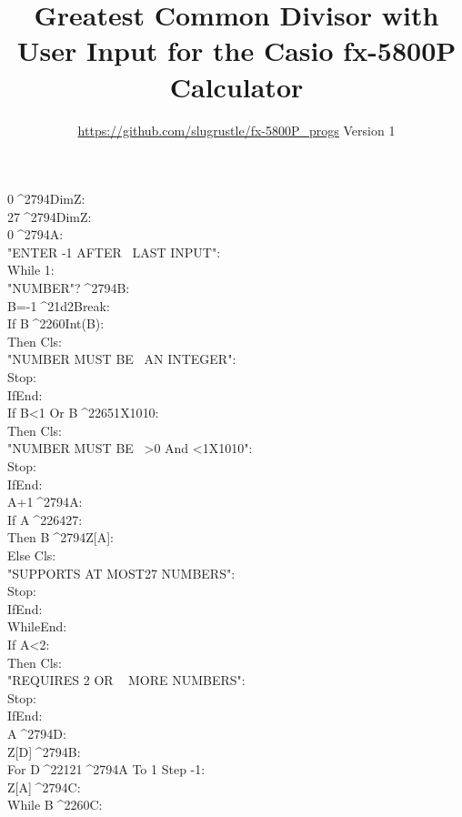 \documentclass[11pt,letterpaper,twocolumn]{article}
\date{}
\newcommand{\STO}{{\large ^^^^2794}}
\newcommand{\CBR}{{\Large ^^^^21d2}}
\newcommand{\NEQ}{^^^^2260}
\newcommand{\LEQ}{^^^^2264}
\newcommand{\GEQ}{^^^^2265}
\newcommand{\MINUS}{^^^^2212}
\newcommand{\EXPTEN}{{\scriptsize X10}}
\newcommand{\IDENT}[1]{\hspace*{#1\BaseIndent}}
\begin{document}
\title{Greatest Common Divisor with User Input for the Casio fx-5800P Calculator}
\author{\url{https://github.com/slugrustle/fx-5800P_progs} \quad Version 1}
\maketitle
\thispagestyle{fancy}

\begin{linenumbers}
0\STO DimZ:\\
27\STO DimZ:\\
0\STO A:\\
"ENTER -1 AFTER ~LAST INPUT":\\
While 1:\\
\IDENT{1}"NUMBER"?\STO B:\\
\IDENT{1}B=-1\CBR Break:\\
\IDENT{1}If B\NEQ Int(B):\\
\IDENT{2}Then Cls:\\
\IDENT{2}"NUMBER MUST BE ~AN INTEGER":\\
\IDENT{2}Stop:\\
\IDENT{1}IfEnd:\\
\IDENT{1}If B<1 Or B\GEQ 1\EXPTEN 10:\\
\IDENT{2}Then Cls:\\
\IDENT{2}"NUMBER MUST BE ~>0 And <1\EXPTEN 10":\\
\IDENT{2}Stop:\\
\IDENT{1}IfEnd:\\
\IDENT{1}A+1\STO A:\\
\IDENT{1}If A\LEQ 27:\\
\IDENT{2}Then B\STO Z[A]:\\
\IDENT{1}Else Cls:\\
\IDENT{2}"SUPPORTS AT MOST27 NUMBERS":\\
\IDENT{2}Stop:\\
\IDENT{1}IfEnd:\\
WhileEnd:\\
If A<2:\\
\IDENT{1}Then Cls:\\
\IDENT{1}"REQUIRES 2 OR ~ MORE NUMBERS":\\
\IDENT{1}Stop:\\
IfEnd:\\
A\STO D:\\
Z[D]\STO B:\\
For D\MINUS 1\STO A To 1 Step -1:\\
\IDENT{1}Z[A]\STO C:\\
\IDENT{1}While B\NEQ C:\\

\end{linenumbers}
\end{document}
